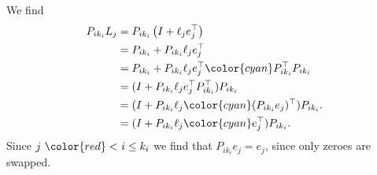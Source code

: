 {
\color{solution}
We find
 \begin{align*}
 P_{ik_i} L_j
  &=  P_{ik_i}\left(I + \ell_je_j^\top \right)\\
  &=  P_{ik_i} +  P_{ik_i}\ell_je_j^\top \\
  &=  P_{ik_i} +  P_{ik_i}\ell_je_j^\top {\color{cyan}P_{ik_i}^\top P_{ik_i} }\\
  &= (I +  P_{ik_i}\ell_je_j^\top  P_{ik_i}^\top) P_{ik_i} \\
  &= (I +  P_{ik_i}\ell_j{\color{cyan} (P_{ik_i}e_j)^\top}) P_{ik_i} .\\
  &= (I +  P_{ik_i}\ell_j{\color{cyan}e_j^\top}) P_{ik_i} .
 \end{align*}
 Since $j~{\color{red}<} ~i \leq k_i$ we find that $P_{ik_i}e_j=e_j$, since only zeroes are swapped.
}

